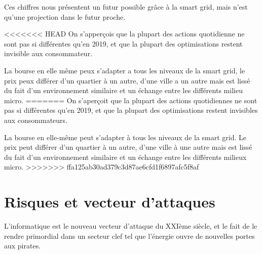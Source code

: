 Ces chiffres nous présentent un futur possible grâce à la smart grid, mais n'est qu'une projection dans le futur proche.

<<<<<<< HEAD
On s'apperçois que la plupart des actions quotidienne ne sont pas si différentes qu'en 2019, et que la plupart des
optimisations restent invisible aux consommateur.

La bourse en elle même peux s'adapter a tous les niveaux de la smart grid, le prix peux différer d'un quartier à un autre,
d'une ville a un autre mais est lissé du fait d'un environnement similaire et un échange entre les différents milieu micro.
=======
On s'aperçoit que la plupart des actions quotidiennes ne sont pas si différentes qu'en 2019, et que la plupart des
optimisations restent invisibles aux consommateurs.

La bourse en elle-même peut s'adapter à tous les niveaux de la smart grid. Le prix peut différer d'un quartier à un autre,
d'une ville à une autre mais est lissé du fait d'un environnement similaire et un échange entre les différents milieux micro.
>>>>>>> ffa125ab30ad379c3d87ae6cfd1f6897afc5f8af

\section{Risques et vecteur d'attaques}

L'informatique est le nouveau vecteur d'attaque du XXIème siècle, et le fait de le rendre primordial
dans un secteur clef tel que l'énergie ouvre de nouvelles portes aux pirates.
